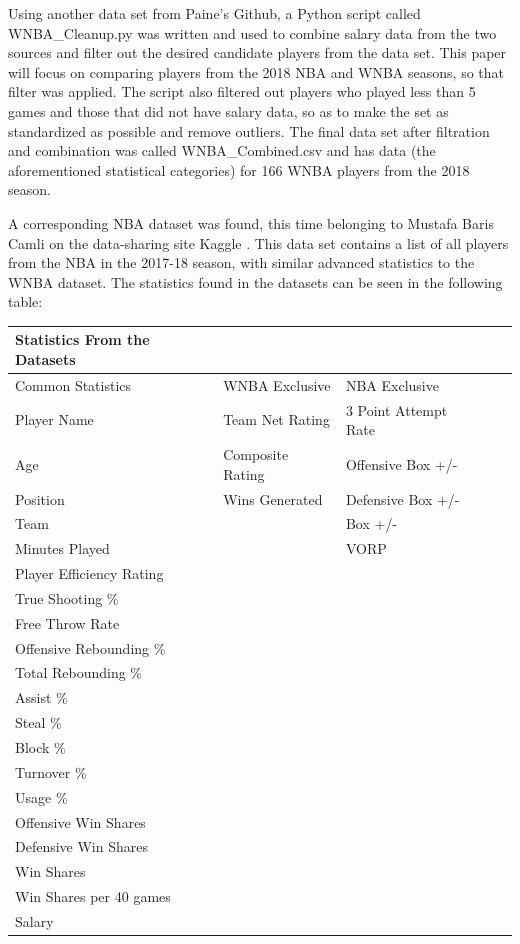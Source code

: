 \documentclass[12pt]{article}
\begin{document}
\par
Using another data set from Paine’s Github, a Python script called WNBA\_Cleanup.py was written and used to combine salary data from the two sources and 
filter out the desired candidate players from the data set. This paper will focus on comparing players from the 2018 NBA and WNBA seasons, so that filter 
was applied. The script also filtered out players who played less than 5 games and those that did not have salary data, so as to make the set as 
standardized as possible and remove outliers. The final data set after filtration and combination was called WNBA\_Combined.csv and has data (the 
aforementioned statistical categories) for 166 WNBA players from the 2018 season.
\par
A corresponding NBA dataset was found, this time belonging to Mustafa Baris Camli on the data-sharing site Kaggle \citep{nba}. This data set contains a 
list of all players from the NBA in the 2017-18 season, with similar advanced statistics to the WNBA dataset. The statistics found in the datasets can be 
seen in the following table:
\newline
\par
\begin{tabular}{*5l} 
\toprule
Statistics From the Datasets \\\midrule

Common Statistics & WNBA Exclusive & NBA Exclusive\\ 
\hline
 Player Name  &  Team Net Rating & 3 Point Attempt Rate  \\
 Age &  Composite Rating & Offensive Box +/-      \\ 
 Position &  Wins Generated & Defensive Box +/-\\
 Team &  & Box +/-     \\         
 Minutes Played &  & VORP       \\
 Player Efficiency Rating & &      \\
 True Shooting \% & & \\
 Free Throw Rate & &\\
 Offensive Rebounding \% & & \\
 Total Rebounding \% & & \\
 Assist \% & & \\
 Steal \% & & \\
 Block \% & & \\
 Turnover \% & & \\
 Usage \% & & \\
 Offensive Win Shares & & \\
 Defensive Win Shares  & & \\
 Win Shares & & \\
 Win Shares per 40 games & & \\
 Salary & & \\
 
 \hline
\end{tabular}
\end{document}
